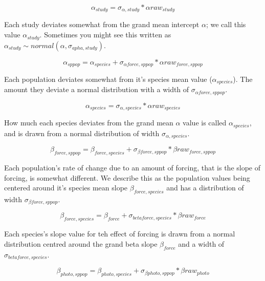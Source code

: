 \documentclass[11pt,letter]{article}
\begin{document}
\begin{equation}
\alpha_{study} = \sigma_{\alpha, study} * \alpha raw_{study}
\end{equation}

Each study deviates somewhat from the grand mean intercept $\alpha$; we call this value $\alpha_{study}$. Sometimes you might see this written as  $\alpha_{study} \sim normal(\alpha, \sigma_{apha,study})$. 

\begin{equation}
\alpha_{sppop} = \alpha_{species}  + \sigma_{\alpha force,sppop} * \alpha raw_{force,sppop}
\end{equation}

Each population deviates somewhat from it's species mean value ($\alpha_{species}$). The amount they deviate a normal distribution with a width of $\sigma_{\alpha force,sppop}$. 

\begin{equation}
\alpha_{species} = \sigma_{\alpha, species} * \alpha raw_{species}
\end{equation}

How much each species deviates from the grand mean $\alpha$ value is called $\alpha_{species} $, and is drawn from a normal distribution of width $\sigma_{\alpha, species} $. 

\begin{equation}
\beta _{force,sppop} = \beta _{force, species} + \sigma_{\beta force,sppop} * \beta raw_{force,sppop}
\end{equation}

Each population's rate of change due to an amount of forcing, that is the slope of forcing, is somewhat different. We describe this as the population values being centered around it's species mean slope $ \beta _{force, species}$ and has a distribution of width $\sigma_{\beta force,sppop} $. 

\begin{equation}
\beta _{force,species} = \beta_{force} + \sigma_{beta force, species} * \beta raw_{force}
\end{equation}

Each species's slope value for teh effect of forcing is drawn from a normal distribution centred around the grand beta slope $\beta_{force}$ and a width of $\sigma_{beta force, species}$.

\begin{equation}
\beta _{photo,sppop} = \beta_{photo,species} + \sigma_{\beta photo,sppop} * \beta raw_{photo}
\end{equation}
\end{document}
